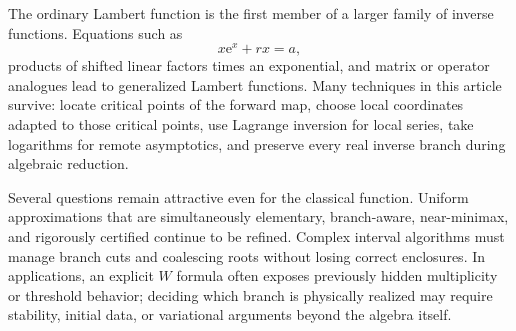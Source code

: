 \documentclass[11pt,openany]{book}
\newcommand{\e}{\mathrm{e}}
\theoremstyle{plain}
\theoremstyle{definition}
\theoremstyle{remark}
\begin{document}
The ordinary Lambert function is the first member of a larger family of
inverse functions.  Equations such as
\[
       x\e^x+r x=a,
\]
products of shifted linear factors times an exponential, and matrix or operator
analogues lead to generalized Lambert functions.  Many techniques in this
article survive: locate critical points of the forward map, choose local
coordinates adapted to those critical points, use Lagrange inversion for local
series, take logarithms for remote asymptotics, and preserve every real inverse
branch during algebraic reduction.

Several questions remain attractive even for the classical function.
Uniform approximations that are simultaneously elementary, branch-aware,
near-minimax, and rigorously certified continue to be refined.  Complex
interval algorithms must manage branch cuts and coalescing roots without losing
correct enclosures.  In applications, an explicit \(W\) formula often exposes
previously hidden multiplicity or threshold behavior; deciding which branch is
physically realized may require stability, initial data, or variational
arguments beyond the algebra itself.

\backmatter
\end{document}
